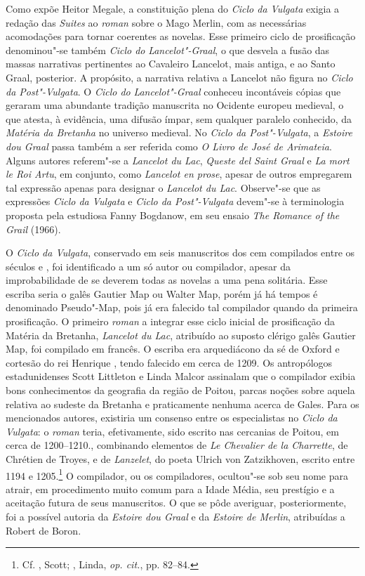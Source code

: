 Como expõe Heitor Megale, a constituição plena do \textit{Ciclo da Vulgata}
exigia a redação das \textit{Suites} ao \textit{roman} sobre o Mago Merlin, com
as necessárias acomodações para tornar coerentes as novelas. Esse primeiro
ciclo de prosificação denominou"-se também \textit{Ciclo do}
\textit{Lancelot"-Graal}, o que desvela a fusão das massas narrativas
pertinentes ao Cavaleiro Lancelot, mais antiga, e ao Santo Graal, posterior. A
propósito, a narrativa relativa a Lancelot não figura no \textit{Ciclo da
Post"-Vulgata}. O \textit{Ciclo do} \textit{Lancelot"-Graal} conheceu incontáveis
cópias que geraram uma abundante tradição manuscrita no Ocidente europeu
medieval, o que atesta, à evidência, uma difusão ímpar, sem qualquer paralelo
conhecido, da \textit{Matéria da Bretanha }no universo medieval. No
\textit{Ciclo da Post"-Vulgata}, a \textit{Estoire dou Graal} passa também a ser
referida como \textit{O Livro de José de Arimateia}. Alguns autores referem"-se
a \textit{Lancelot du Lac}, \textit{Queste del Saint Graal} e  \textit{La mort
le Roi Artu}, em conjunto, como \textit{Lancelot en prose}, apesar de outros
empregarem tal expressão apenas para designar o \textit{Lancelot du Lac}.
Observe"-se que as expressões \textit{Ciclo da Vulgata} e \textit{Ciclo da
Post"-Vulgata} devem"-se à terminologia proposta pela estudiosa Fanny Bogdanow,
em seu ensaio \textit{The Romance of the Grail }(1966). 

O \textit{Ciclo da Vulgata}, conservado em seis manuscritos dos cem compilados
entre os séculos  e , foi identificado a um só autor ou compilador,
apesar da improbabilidade de se deverem todas as novelas a uma pena solitária.
Esse escriba seria o galês Gautier Map ou Walter Map, porém já há tempos é
denominado Pseudo"-Map, pois já era falecido tal compilador quando da primeira
prosificação. O primeiro \textit{roman} a integrar esse ciclo inicial de
prosificação da Matéria da Bretanha, \textit{Lancelot du Lac}, atribuído ao
suposto clérigo galês Gautier Map, foi compilado em francês. O escriba era
arquediácono da sé de Oxford e cortesão do rei Henrique , tendo falecido em
cerca de 1209. Os antropólogos estadunidenses Scott Littleton e Linda Malcor assinalam que o compilador exibia
bons conhecimentos da geografia da região de Poitou, parcas noções sobre aquela
relativa ao sudeste da Bretanha e praticamente nenhuma acerca de Gales. Para os
mencionados autores, existiria um consenso entre os especialistas no
\textit{Ciclo da Vulgata}: o \textit{roman} teria, efetivamente, sido escrito nas
cercanias de Poitou, em cerca de 1200--1210., combinando elementos de
\textit{Le Chevalier de la Charrette}, de Chrétien de Troyes, e de
\textit{Lanzelet}, do poeta Ulrich von Zatzikhoven, escrito entre 1194 e
1205.\footnote{ Cf. , Scott; , Linda, \textit{op. cit.}, pp.
82--84. } O compilador, ou os compiladores, ocultou"-se sob seu nome para
atrair, em procedimento muito comum para a Idade Média, seu prestígio e a
aceitação futura de seus manuscritos. O que se pôde averiguar, posteriormente,
foi a possível autoria da \textit{Estoire dou Graal} e da \textit{Estoire de
Merlin}, atribuídas a Robert de Boron.

